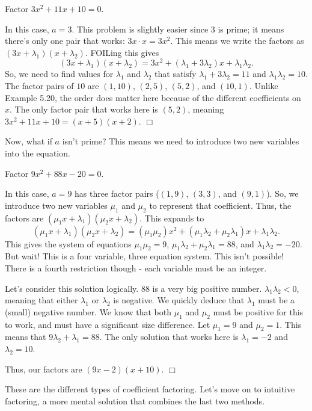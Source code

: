 \documentclass[lang=en,11pt]{elegantbook}
\begin{document}
\begin{example}
Factor $3x^2+11x+10=0$.  
\end{example}
\begin{solution}
In this case, $a=3$.  This problem is slightly easier since $3$ is prime; it means there's only one pair that works: $3x\cdot x=3x^2$.  This means we write the factors as $(3x+\lambda_1)(x+\lambda_2)$.  FOILing this gives $$(3x+\lambda_1)(x+\lambda_2)=3x^2+(\lambda_1+3\lambda_2)x+\lambda_1\lambda_2.$$  So, we need to find values for $\lambda_1$ and $\lambda_2$ that satisfy $\lambda_1+3\lambda_2=11$ and $\lambda_1\lambda_2=10$.  The factor pairs of $10$ are $(1,10)$, $(2,5)$, $(5,2)$, and $(10,1)$.  Unlike Example 5.20, the order does matter here because of the different coefficients on $x$.  The only factor pair that works here is $(5,2)$, meaning $3x^2+11x+10=(x+5)(x+2)$.  $\Box$
\end{solution}
Now, what if $a$ isn't prime?  This means we need to introduce two new variables into the equation.
\begin{example}
Factor $9x^2+88x-20=0$.
\end{example}
\begin{solution}
In this case, $a=9$ has three factor pairs ($(1,9)$, $(3,3)$, and $(9,1)$).  So, we introduce two new variables $\mu_1$ and $\mu_2$ to represent that coefficient.  Thus, the factors are $(\mu_1x+\lambda_1)(\mu_2x+\lambda_2)$.  This expands to $$(\mu_1x+\lambda_1)(\mu_2x+\lambda_2)=(\mu_1\mu_2)x^2+\left(\mu_1\lambda_2+\mu_2\lambda_1\right)x+\lambda_1\lambda_2.$$
This gives the system of equations $\mu_1\mu_2=9$, $\mu_1\lambda_2+\mu_2\lambda_1=88$, and $\lambda_1\lambda_2=-20$.  But wait!  This is a four variable, three equation system.  This isn't possible!  There is a fourth restriction though - each variable must be an integer.

Let's consider this solution logically.  $88$ is a very big positive number.  $\lambda_1\lambda_2<0$, meaning that either $\lambda_1$ or $\lambda_2$ is negative.  We quickly deduce that $\lambda_1$ must be a (small) negative number.  We know that both $\mu_1$ and $\mu_2$ must be positive for this to work, and must have a significant size difference.  Let $\mu_1=9$ and $\mu_2=1$.  This means that $9\lambda_2+\lambda_1=88$.  The only solution that works here is $\lambda_1=-2$ and $\lambda_2=10$.  

Thus, our factors are $(9x-2)(x+10)$.  $\Box$
\end{solution}
These are the different types of coefficient factoring.  Let's move on to intuitive factoring, a more mental solution that combines the last two methods.
\end{document}
